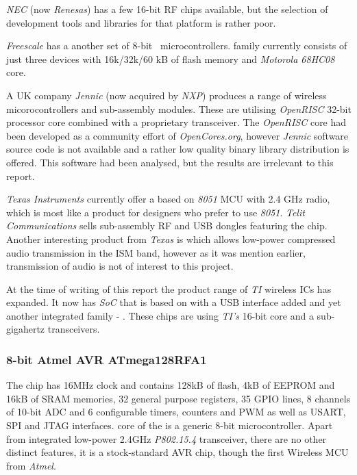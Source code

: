  \emph{NEC} (now \emph{Renesas}) has a few 16-bit RF chips available,
 but the selection of development tools and libraries for that platform
 is rather poor.

 \emph{Freescale} has a another set of 8-bit \WPAN\ microcontrollers.
  family currently consists of just three devices with
 16k/32k/60 kB of flash memory and \emph{Motorola 68HC08} core.

 A UK company \emph{Jennic} (now acquired by \emph{NXP}) produces a
 range of wireless micorocontrollers and sub-assembly modules. These
 are utilising \emph{OpenRISC} 32-bit processor core combined with a
 proprietary transceiver. The \emph{OpenRISC} core had been developed
 as a community effort of \emph{OpenCores.org}, however \emph{Jennic}
 software source code is not available and a rather low quality binary
 library distribution is offered. This software had been analysed, but
 the results are irrelevant to this report.

 \emph{Texas Instruments} currently offer a  based on
 \emph{8051} MCU with 2.4 GHz radio, which is most like a product for
 designers who prefer to use \emph{8051}. \emph{Telit Communications}
 sells sub-assembly RF and USB dongles featuring the  chip.
 Another interesting product from \emph{Texas} is  which
 allows low-power compressed audio transmission in the ISM band, however
 as it was mention earlier, transmission of audio is not of interest
 to this project.

 At the time of writing of this report the product range of \emph{TI}
 wireless ICs has expanded. It now has  \emph{SoC}
 that is based on  with a USB interface added and
 yet another integrated family - . These chips are using
 \emph{TI's}  16-bit core and a sub-gigahertz 
 transceivers.

\subsubsection{8-bit Atmel AVR ATmega128RFA1}

 The  \cite{atmel:atmega128rfa1:datasheet} chip
 has 16MHz clock and contains 128kB of flash, 4kB of EEPROM and 16kB
 of SRAM memories, 32 general purpose registers, 35 GPIO lines, 8
 channels of 10-bit ADC and 6 configurable timers, counters and PWM
 as well as USART, SPI and JTAG interfaces.  core
 of the  is a generic 8-bit microcontroller.
 Apart from integrated  \cite{atmel:at86rf231:datasheet}
 low-power 2.4GHz \emph{P802.15.4} transceiver, there are no other
 distinct features, it is a stock-standard AVR chip, though the first
 Wireless MCU from \emph{Atmel}.

